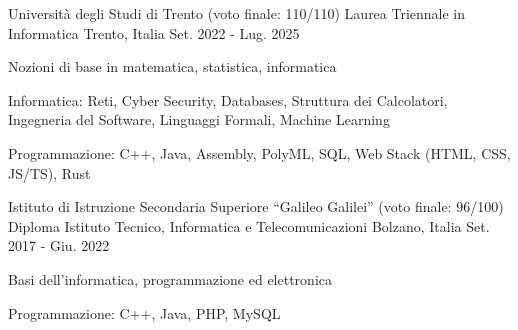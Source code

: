 

\begin{cventries}

  \cventry
    {Università degli Studi di Trento (voto finale: 110/110)}
    {Laurea Triennale in Informatica}
    {Trento, Italia}
    {Set. 2022 - Lug. 2025} %
    {
      \begin{cvitems} %
        \item {Nozioni di base in matematica, statistica, informatica}
        \item {Informatica: Reti, Cyber Security, Databases, Struttura dei Calcolatori, Ingegneria del Software, Linguaggi Formali, Machine Learning}
        \item {Programmazione: C++, Java, Assembly, PolyML, SQL, Web Stack (HTML, CSS, JS/TS), Rust}
      \end{cvitems}
    }

  \cventry
    {Istituto di Istruzione Secondaria Superiore “Galileo Galilei” (voto finale: 96/100)} %
    {Diploma Istituto Tecnico, Informatica e Telecomunicazioni} %
    {Bolzano, Italia} %
    {Set. 2017 - Giu. 2022} %
    {
      \begin{cvitems} %
        \item {Basi dell'informatica, programmazione ed elettronica}
        \item {Programmazione: C++, Java, PHP, MySQL}
      \end{cvitems}
    }

\end{cventries}
